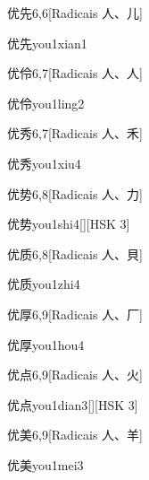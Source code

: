 \begin{entry}{优先}{6,6}[Radicais ⼈、⼉]
  \begin{phonetics}{优先}{you1xian1}
  \end{phonetics}
\end{entry}

\begin{entry}{优伶}{6,7}[Radicais ⼈、⼈]
  \begin{phonetics}{优伶}{you1ling2}
  \end{phonetics}
\end{entry}

\begin{entry}{优秀}{6,7}[Radicais ⼈、⽲]
  \begin{phonetics}{优秀}{you1xiu4}
  \end{phonetics}
\end{entry}

\begin{entry}{优势}{6,8}[Radicais ⼈、⼒]
  \begin{phonetics}{优势}{you1shi4}[][HSK 3]
  \end{phonetics}
\end{entry}

\begin{entry}{优质}{6,8}[Radicais ⼈、⾙]
  \begin{phonetics}{优质}{you1zhi4}
  \end{phonetics}
\end{entry}

\begin{entry}{优厚}{6,9}[Radicais ⼈、⼚]
  \begin{phonetics}{优厚}{you1hou4}
  \end{phonetics}
\end{entry}

\begin{entry}{优点}{6,9}[Radicais ⼈、⽕]
  \begin{phonetics}{优点}{you1dian3}[][HSK 3]
  \end{phonetics}
\end{entry}

\begin{entry}{优美}{6,9}[Radicais ⼈、⽺]
  \begin{phonetics}{优美}{you1mei3}
  \end{phonetics}
\end{entry}

